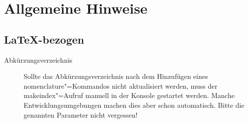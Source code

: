 
\chapter{Allgemeine Hinweise}
\section{\LaTeX-bezogen}
\begin{description}
\item[Abkürzungsverzeichnis]
      Sollte das Abkürzungsverzeichnis nach dem Hinzufügen eines
      {\ttfamily nomenclature}"=Kommandos nicht aktualisiert werden,
      muss der {\ttfamily makeindex}"=Aufruf
      manuell in der Konsole gestartet werden. Manche
      Entwicklungsumgebungen machen dies aber schon automatisch.
      Bitte die genannten Parameter nicht vergessen!


\end{description}
